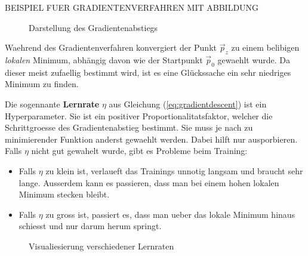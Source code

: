 \documentclass[../main]{subfiles}
\begin{document}
BEISPIEL FUER GRADIENTENVERFAHREN MIT ABBILDUNG

\begin{figure}[h!]
  \centering

  \caption{Darstellung des Gradientenabstiegs}
\end{figure}

Waehrend des Gradientenverfahren konvergiert der Punkt $\vec{p}_z$ zu einem belibigen \textit{lokalen} Minimum, abhängig davon wie der Startpunkt $\vec{p}_0$ gewaehlt wurde.
Da dieser meist zufaellig bestimmt wird, ist es eine Glückssache ein sehr niedriges Minimum zu finden.
\par\medskip
Die sogennante \textbf{Lernrate} $\eta$ aus Gleichung (\ref{eq:gradientdescent}) ist ein Hyperparameter.
Sie ist ein positiver Proportionalitatsfaktor, welcher die Schrittgroesse des Gradientenabstieg bestimmt. Sie muss je nach zu minimierender Funktion anderst gewaehlt werden.
Dabei hilft nur ausporbieren. Falls $\eta$ nicht gut gewahelt wurde, gibt es Probleme beim Training:
\begin{itemize}
\item{Falls $\eta$ zu klein ist, verlaueft das Trainings unnotig langsam und braucht sehr lange.
    Ausserdem kann es passieren, dass man bei einem hohen lokalen Minimum stecken bleibt.}

\item{Falls $\eta$ zu gross ist, passiert es, dass man ueber das lokale Minimum hinaus schiesst und nur darum herum springt.}
\end{itemize}

\begin{figure}[h!]
  \centering
  \caption{Visualiesierung verschiedener Lernraten}
\end{figure}
\end{document}
